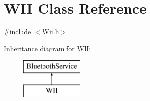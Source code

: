 \hypertarget{class_w_i_i}{\section{\-W\-I\-I \-Class \-Reference}
\label{class_w_i_i}
}


{\ttfamily \#include $<$\-Wii.\-h$>$}

\-Inheritance diagram for \-W\-I\-I\-:\begin{figure}[H]
\begin{center}
\leavevmode
\includegraphics[height=2.000000cm]{class_w_i_i}
\end{center}
\end{figure}
